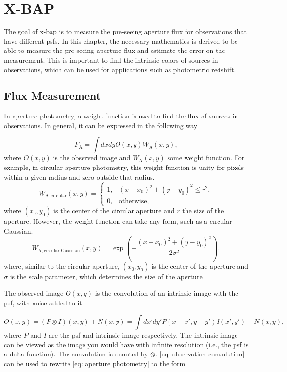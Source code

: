 \section{X-BAP}\label{ch: x-bap}

The goal of \gls{x-bap} is to measure the pre-seeing aperture flux for observations that have different \glspl{psf}. In this chapter, the necessary mathematics is derived to be able to measure the pre-seeing aperture flux and estimate the error on the measurement. This is important to find the intrinsic colors of sources in observations, which can be used for applications such as photometric redshift.


\subsection{Flux Measurement}\label{subsec: flux measurement}

In aperture photometry, a weight function is used to find the flux of sources in observations. In general, it can be expressed in the following way

\begin{equation}\label{eq: aperture photometry}
    F_\mathrm{A} = \int dxdyO(x,y)W_\mathrm{A}(x,y),
\end{equation}
where $O(x,y)$ is the observed image and $W_\mathrm{A}(x,y)$ some weight function. For example, in circular aperture photometry, this weight function is unity for pixels within a given radius and zero outside that radius.
\[
W_\mathrm{A,circular}(x,y) =
\begin{cases}
1, & (x-x_0)^2+ (y-y_0)^2 \le r^2, \\
0, & \mathrm{otherwise},
\end{cases}
\]
where $(x_0, y_0)$ is the center of the circular aperture and $r$ the size of the aperture. However, the weight function can take any form, such as a circular Gaussian. 
\begin{equation}
    W_\mathrm{A,circular\;Gaussian}(x,y)=
\exp\left(
-\frac{(x-x_0)^2+(y-y_0)^2}{2\sigma^2}
\right),
\end{equation}
where, similar to the circular aperture, $(x_0, y_0)$ is the center of the aperture and $\sigma$ is the scale parameter, which determines the size of the aperture.

The observed image $O(x,y)$ is the convolution of an intrinsic image with the \gls{psf}, with noise added to it

\begin{equation}\label{eq: observation convolution}
    O(x,y)=(P\otimes I)(x,y)+N(x,y) = \int dx'dy'P(x-x', y-y')I(x',y')+N(x,y),
\end{equation}
where $P$ and $I$ are the \gls{psf} and intrinsic image respectively. The intrinsic image can be viewed as the image you would have with infinite resolution (i.e., the \gls{psf} is a delta function). The convolution is denoted by $\otimes$.
\autoref{eq: observation convolution} can be used to rewrite \autoref{eq: aperture photometry} to the form

